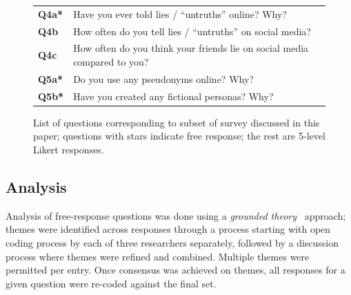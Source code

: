 \documentclass{sig-alternate}
\begin{document}
\begin{figure}[tbp]
    \begin{tabular}{ l | p{7cm} }
    \small
      {\bf Q4a*} & Have you ever told lies / ``untruths'' online? Why? \\
      {\bf Q4b} & How often do you tell lies / ``untruths'' on social media? \\
      {\bf Q4c} & How often do you think your friends lie on social media compared to you? \\      
      {\bf Q5a*} & Do you use any pseudonyms online? Why? \\
      {\bf Q5b*} & Have you created any fictional personas? Why?
    \end{tabular}
    \caption{%
    	List of questions corresponding to subset of survey discussed in this paper; questions with stars indicate free response; the rest are 5-level Likert responses. 
     }%
   \label{fig:questionnaire}
   \vspace{0.25cm}
\end{figure}

\subsection{Analysis}
Analysis of free-response questions was done using a \emph{grounded theory}~\cite{strauss1990basics} approach; themes were identified across responses through a process starting with open coding process by each of three researchers separately, followed by a discussion process where themes were refined and combined. Multiple themes were permitted per entry. Once consensus was achieved on themes, all responses for a given question were re-coded against the final set.
\end{document}
